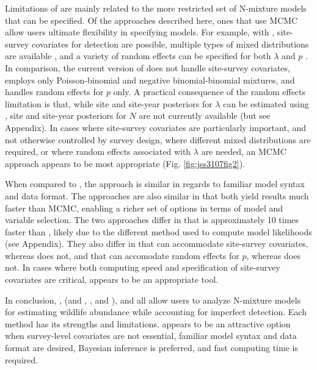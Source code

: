 \documentclass[codesnippet]{jss}
\begin{document}
Limitations of  are mainly related to the more restricted set of 
N-mixture models that can be specified. Of the approaches described here, 
ones that use MCMC allow users ultimate flexibility in specifying models. 
For example, with , site-survey covariates for detection are 
possible, multiple types of mixed distributions are available 
\citep{Joseph_Elkin_Martin_Possingham_2009,Martin_Royle_Mackenzie_Edwards_Kery_Gardner_2011},
 and a variety of random effects can be specified for both $\lambda$ and $p$ 
\citep{Kery_Schaub_2011}. In comparison, the current version of  
does not handle site-survey covariates, employs only Poisson-binomial and 
negative binomial-binomial mixtures, and handles random effects for $p$ 
only. A practical consequence of the random effects limitation is that, 
while site and site-year posteriors for $\lambda$ can be estimated using 
, site and site-year posteriors for $N$ are not currently 
available (but see Appendix). In cases where site-survey covariates are 
particularly important, and not otherwise controlled by survey design, where 
different mixed distributions are required, or where random effects 
associated with $\lambda$ are needed, an MCMC approach appears to be most 
appropriate (Fig. \ref{fig:jss3107fig2}).

When compared to , the  approach is similar in 
regards to familiar model syntax and data format. The approaches are also 
similar in that both yield results much faster than MCMC, enabling a richer 
set of options in terms of model and variable selection. The two approaches 
differ in that  is approximately 10 times faster than 
, likely due to the different method used to compute model 
likelihoods (see Appendix). They also differ in that  can 
accommodate site-survey covariates, whereas  does not, and that 
 can accomodate random effects for $p$, whereas  
does not. In cases where both computing speed and specification of 
site-survey covariates are critical,  appears to be an 
appropriate tool.

In conclusion, ,  (and , , and ), and  all allow users to analyze N-mixture models for estimating wildlife abundance while accounting for imperfect detection. Each method has its strengths and limitations.  appears to be an attractive option when survey-level covariates are not essential, familiar model syntax and data format are desired, Bayesian inference is preferred, and fast computing time is required.
\end{document}
